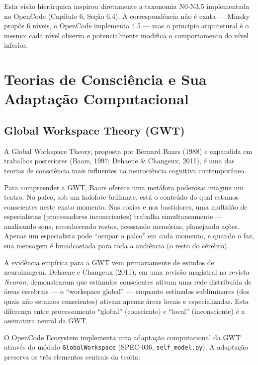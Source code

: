 Esta visão hierárquica inspirou diretamente a taxonomia N0-N3.5 implementada no OpenCode (Capítulo 6, Seção 6.4). A correspondência não é exata — Minsky propôs 6 níveis, o OpenCode implementa 4.5 — mas o princípio arquitetural é o mesmo: cada nível observa e potencialmente modifica o comportamento do nível inferior.

\section{Teorias de Consciência e Sua Adaptação Computacional}

\subsection{Global Workspace Theory (GWT)}

A Global Workspace Theory, proposta por Bernard Baars (1988)  e expandida em trabalhos posteriores (Baars, 1997; Dehaene \& Changeux, 2011), é uma das teorias de consciência mais influentes na neurociência cognitiva contemporânea.

Para compreender a GWT, Baars oferece uma metáfora poderosa: imagine um teatro. No palco, sob um holofote brilhante, está o conteúdo do qual estamos conscientes neste exato momento. Nas coxias e nos bastidores, uma multidão de especialistas (processadores inconscientes) trabalha simultaneamente — analisando sons, reconhecendo rostos, acessando memórias, planejando ações. Apenas um especialista pode ``ocupar o palco'' em cada momento, e quando o faz, sua mensagem é broadcastada para toda a audiência (o resto do cérebro).

A evidência empírica para a GWT vem primariamente de estudos de neuroimagem. Dehaene e Changeux (2011), em uma revisão magistral na revista \textit{Neuron}, demonstraram que estímulos conscientes ativam uma rede distribuída de áreas cerebrais — o ``workspace global'' — enquanto estímulos subliminares (dos quais não estamos conscientes) ativam apenas áreas locais e especializadas. Esta diferença entre processamento ``global'' (consciente) e ``local'' (inconsciente) é a assinatura neural da GWT.

O OpenCode Ecosystem implementa uma adaptação computacional da GWT através do módulo \texttt{GlobalWorkspace} (SPEC-036, \texttt{self\_model.py}). A adaptação preserva os três elementos centrais da teoria:

